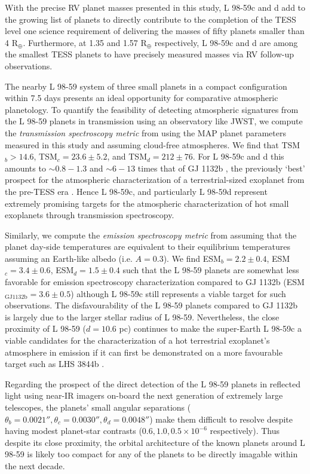 \documentclass[longauth]{aa}
\begin{document}
With the precise RV planet masses presented in this study, L 98-59c and d add to the growing list of planets to directly contribute to the completion of the TESS level one science requirement of delivering the masses of fifty planets smaller than 4 R$_{\oplus}$. Furthermore, at 1.35 and 1.57 R$_{\oplus}$ respectively, L 98-59c and d are among the smallest TESS planets to have precisely measured masses via RV follow-up observations.

The nearby L 98-59 system of three small planets in a compact configuration within 7.5 days presents an ideal opportunity for comparative atmospheric planetology. To quantify the feasibility of detecting atmospheric signatures from the L 98-59 planets in transmission using an observatory like JWST, we compute the \emph{transmission spectroscopy metric} from \cite{kempton18} using the MAP planet parameters measured in this study and assuming cloud-free atmospheres. We find that TSM$_b > 14.6$, TSM$_c=23.6\pm 5.2$, and TSM$_d=212\pm 76$. For L 98-59c and d this amounts to $\sim 0.8-1.3$ and $\sim 6-13$ times that of GJ 1132b \citep{dittmann17a,bonfils18}, the previously `best' prospect for the atmospheric characterization of a terrestrial-sized exoplanet from the pre-TESS era \citep{morley17}. Hence L 98-59c, and particularly L 98-59d represent extremely promising targets for the atmospheric characterization of hot small exoplanets through transmission spectroscopy.

Similarly, we compute the \emph{emission spectroscopy metric} from \cite{kempton18} assuming that the planet day-side temperatures are equivalent to their equilibrium temperatures assuming an Earth-like albedo (i.e. $A=0.3$). We find ESM$_b=2.2\pm 0.4$, ESM$_c=3.4\pm 0.6$, ESM$_d=1.5\pm 0.4$ such that the L 98-59 planets are somewhat less favorable for emission spectroscopy characterization compared to GJ 1132b (ESM$_{\text{GJ1132b}}=3.6\pm 0.5$) although L 98-59c still represents a viable target for such observations. The disfavourability of the L 98-59 planets compared to GJ 1132b is largely due to the larger stellar radius of L 98-59. Nevertheless, the close proximity of L 98-59 ($d=10.6$ pc) continues to make the super-Earth L 98-59c a viable candidates for the characterization of a hot terrestrial exoplanet's atmosphere in emission if it can first be demonstrated on a more favourable target such as LHS 3844b \citep{vanderspek19}.

Regarding the prospect of the direct detection of the L 98-59 planets in reflected light using near-IR imagers on-board the next generation of extremely large telescopes, the planets' small angular separations ($\theta_b=0.0021'', \theta_c=0.0030'', \theta_d=0.0048''$) make them difficult to resolve despite having modest planet-star contrasts ($0.6,1.0,0.5 \times 10^{-6}$ respectively). Thus despite its close proximity, the orbital architecture of the known planets around L 98-59 is likely too compact for any of the planets to be directly imagable within the next decade.
\end{document}
